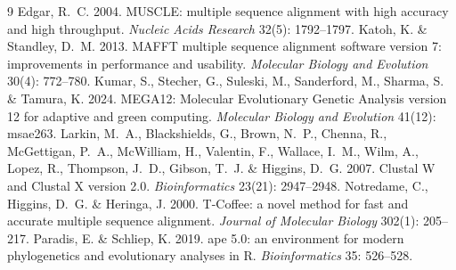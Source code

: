 \documentclass[11pt,a4paper]{article}
\begin{document}
\begin{thebibliography}{9}
 Edgar, R.~C. 2004. MUSCLE: multiple sequence alignment with high accuracy
and high throughput. \emph{Nucleic Acids Research} 32(5): 1792--1797.
 Katoh, K. \& Standley, D.~M. 2013. MAFFT multiple sequence alignment
software version 7: improvements in performance and usability. \emph{Molecular Biology and
Evolution} 30(4): 772--780.
 Kumar, S., Stecher, G., Suleski, M., Sanderford, M., Sharma, S. \&
Tamura, K. 2024. MEGA12: Molecular Evolutionary Genetic Analysis version 12 for adaptive and
green computing. \emph{Molecular Biology and Evolution} 41(12): msae263.
 Larkin, M.~A., Blackshields, G., Brown, N.~P., Chenna, R., McGettigan,
P.~A., McWilliam, H., Valentin, F., Wallace, I.~M., Wilm, A., Lopez, R., Thompson, J.~D.,
Gibson, T.~J. \& Higgins, D.~G. 2007. Clustal W and Clustal X version 2.0.
\emph{Bioinformatics} 23(21): 2947--2948.
 Notredame, C., Higgins, D.~G. \& Heringa, J. 2000. T-Coffee: a novel
method for fast and accurate multiple sequence alignment. \emph{Journal of Molecular Biology}
302(1): 205--217.
 Paradis, E. \& Schliep, K. 2019. ape 5.0: an environment for modern
phylogenetics and evolutionary analyses in R. \emph{Bioinformatics} 35: 526--528.
\end{thebibliography}
\end{document}
